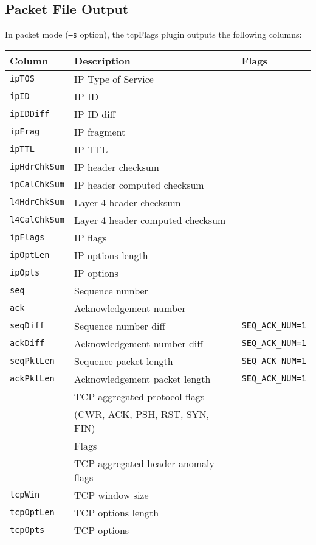 \documentclass[documentation]{subfiles}
\begin{document}
\subsection{Packet File Output}
In packet mode ({\tt --s} option), the tcpFlags plugin outputs the following columns:
\begin{longtable}{lll}
    \toprule
    {\bf Column} & {\bf Description} & {\bf Flags}\\
    \midrule\endhead%
    {\tt ipTOS}                & IP Type of Service\\
    {\tt ipID}                 & IP ID\\
    {\tt ipIDDiff}             & IP ID diff\\
    {\tt ipFrag}               & IP fragment\\
    {\tt ipTTL}                & IP TTL\\
    {\tt ipHdrChkSum}          & IP header checksum\\
    {\tt ipCalChkSum}          & IP header computed checksum\\
    {\tt l4HdrChkSum}          & Layer 4 header checksum\\
    {\tt l4CalChkSum}          & Layer 4 header computed checksum\\
    {\tt ipFlags}              & IP flags\\
    {\tt ipOptLen}             & IP options length\\
    {\tt ipOpts}               & IP options\\
    {\tt seq}                  & Sequence number\\
    {\tt ack}                  & Acknowledgement number\\
    {\tt seqDiff}              & Sequence number diff           & {\tt SEQ\_ACK\_NUM=1}\\
    {\tt ackDiff}              & Acknowledgement number diff    & {\tt SEQ\_ACK\_NUM=1}\\
    {\tt seqPktLen}            & Sequence packet length         & {\tt SEQ\_ACK\_NUM=1}\\
    {\tt ackPktLen}            & Acknowledgement packet length  & {\tt SEQ\_ACK\_NUM=1}\\
    {\tt \nameref{tcpFStat}}   & TCP aggregated protocol flags\\
                               & (CWR, ACK, PSH, RST, SYN, FIN)\\
    {\tt \nameref{tcpFlags}}   & Flags\\
    {\tt \nameref{tcpAnomaly}} & TCP aggregated header anomaly flags\\
    {\tt tcpWin}               & TCP window size\\
    {\tt tcpOptLen}            & TCP options length\\
    {\tt tcpOpts}              & TCP options\\
    \bottomrule
\end{longtable}
\end{document}
